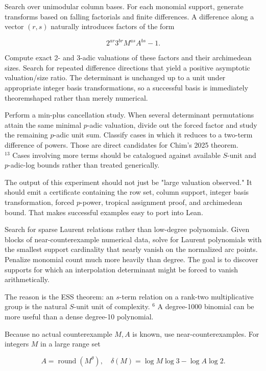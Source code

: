\documentclass[10pt]{article}
\begin{document}
Search over unimodular column bases. For each monomial support, generate transforms based on falling factorials and finite differences. A difference along a vector $(r, s)$ naturally introduces factors of the form

$$
2^{a r} 3^{b r} M^{a s} A^{b s}-1 .
$$

Compute exact 2- and 3-adic valuations of these factors and their archimedean sizes. Search for repeated difference directions that yield a positive asymptotic valuation/size ratio. The determinant is unchanged up to a unit under appropriate integer basis transformations, so a successful basis is immediately theoremshaped rather than merely numerical.

Perform a min-plus cancellation study. When several determinant permutations attain the same minimal $p$-adic valuation, divide out the forced factor and study the remaining $p$-adic unit sum. Classify cases in which it reduces to a two-term difference of powers. Those are direct candidates for Chim's 2025 theorem.\\
${ }^{13}$ Cases involving more terms should be catalogued against available $S$-unit and $p$-adic-log bounds rather than treated generically.

The output of this experiment should not just be "large valuation observed." It should emit a certificate containing the row set, column support, integer basis transformation, forced $p$-power, tropical assignment proof, and archimedean bound. That makes successful examples easy to port into Lean.

Search for sparse Laurent relations rather than low-degree polynomials. Given blocks of near-counterexample numerical data, solve for Laurent polynomials with the smallest support cardinality that nearly vanish on the normalized arc points. Penalize monomial count much more heavily than degree. The goal is to discover supports for which an interpolation determinant might be forced to vanish arithmetically.

The reason is the ESS theorem: an $s$-term relation on a rank-two multiplicative group is the natural $S$-unit unit of complexity. ${ }^{6}$ A degree-1000 binomial can be more useful than a dense degree-10 polynomial.

Because no actual counterexample $M, A$ is known, use near-counterexamples. For integers $M$ in a large range set

$$
A=\operatorname{round}\left(M^{\theta}\right), \quad \delta(M)=\log M \log 3-\log A \log 2 .
$$
\end{document}

